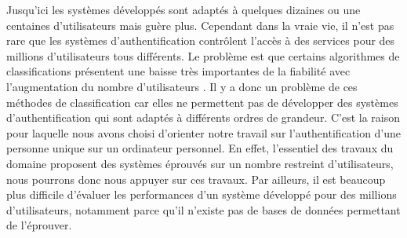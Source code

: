 Jusqu'ici les systèmes développés sont adaptés à quelques dizaines ou une centaines d'utilisateurs mais guère plus. Cependant dans la vraie vie, il n'est pas rare que les systèmes d'authentification contrôlent l'accès à des services pour des millions d'utilisateurs tous différents. Le problème est que certains algorithmes de classifications présentent une baisse très importantes de la fiabilité avec l'augmentation du nombre d'utilisateurs \cite{panasiuk2016}. Il y a donc un problème de ces méthodes de classification car elles ne permettent pas de développer des systèmes d'authentification qui sont adaptés à différents ordres de grandeur. C'est la raison pour laquelle nous avons choisi d'orienter notre travail sur l'authentification d'une personne unique sur un ordinateur personnel. En effet, l'essentiel des travaux du domaine proposent des systèmes éprouvés sur un nombre restreint d'utilisateurs, nous pourrons donc nous appuyer sur ces travaux. Par ailleurs, il est beaucoup plus difficile d'évaluer les performances d'un système développé pour des millions d'utilisateurs, notamment parce qu'il n'existe pas de bases de données permettant de l'éprouver.
